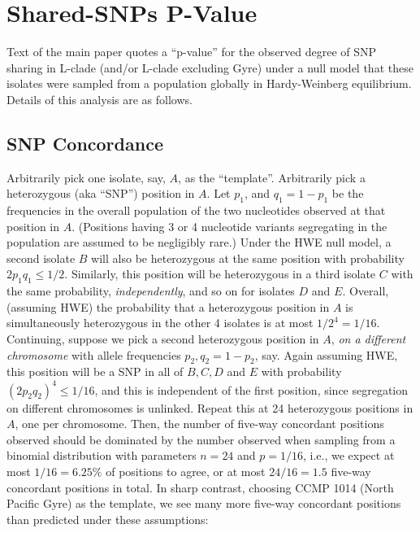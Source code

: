 \documentclass{article}\usepackage[]{graphicx}\usepackage[]{color}
\begin{document}
\section{Shared-SNPs P-Value}

Text of the main paper quotes a ``p-value'' for the observed degree of SNP sharing in L-clade (and/or L-clade excluding Gyre) under a null model that these isolates were sampled from a population globally in Hardy-Weinberg equilibrium.   Details of this analysis are as follows.  

\subsection{SNP Concordance}

Arbitrarily pick one isolate, say, $A$, as the ``template''.  Arbitrarily pick a heterozygous (aka ``SNP'') position in $A$.  Let $p_1$, and $q_1=1-p_1$ be the frequencies in the overall population of the two nucleotides observed at that position in $A$.  (Positions having 3 or 4 nucleotide variants segregating in the population are assumed to be negligibly rare.)  Under the HWE null model, a second isolate $B$ will also be heterozygous at the same position with probability $2p_1q_1 \leq 1/2$.  Similarly, this position will be heterozygous in a third isolate $C$ with the same probability, \emph{independently}, and so on for isolates $D$ and $E$.  Overall, (assuming HWE) the probability that a heterozygous position in $A$ is simultaneously heterozygous in the other 4 isolates is at most $1/2^4=1/16$.  Continuing, suppose we pick a second heterozygous position in $A$, \emph{on a different chromosome} with allele frequencies $p_2, q_2=1-p_2$, say.  Again assuming HWE, this position will be a SNP in all of $B, C, D$ and $E$ with probability $(2p_2q_2)^4 \leq 1/16$, and this is independent of the first position, since segregation on different chromosomes is unlinked.  Repeat this at 24 heterozygous positions in $A$, one per chromosome.  Then, the number of five-way concordant positions observed should be dominated by the number observed when sampling from a binomial distribution with parameters $n=24$ and $p=1/16$, i.e., we expect at most $1/16=6.25\%$ of positions to agree, or at most $24/16=1.5$ five-way concordant positions in total.  In sharp contrast, choosing CCMP 1014 (North Pacific Gyre) as the template, we see many more five-way concordant positions than predicted under these assumptions:
\end{document}
